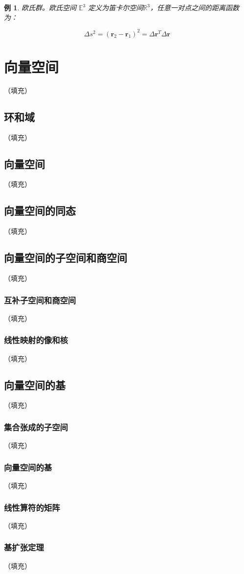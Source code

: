 \documentclass[hyperref,UTF8]{ctexbook}
\newtheorem{eg}{例}[chapter]
\begin{document}
\begin{eg}
    欧氏群。欧氏空间 $\mathbb{E}^{3}$ 定义为笛卡尔空间$\mathbb{R}^{3}$，任意一对点之间的距离函数为：

$$
\Delta s^{2}=\left(\mathbf{r}_{2}-\mathbf{r}_{1}\right)^{2}=\Delta \mathbf{r}^{T} \Delta \mathbf{r}
$$
\end{eg}

\chapter{向量空间}（填充）
\section{环和域}（填充）
\section{向量空间}（填充）
\section{向量空间的同态}（填充）
\section{向量空间的子空间和商空间}（填充）
\subsection{互补子空间和商空间}（填充）
\subsection{线性映射的像和核}（填充）
\section{向量空间的基}（填充）
\subsection{集合张成的子空间}（填充）
\subsection{向量空间的基}（填充）
\subsection{线性算符的矩阵}（填充）
\subsection{基扩张定理}（填充）
\end{document}
